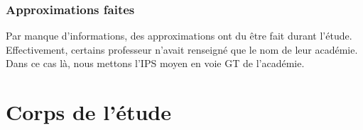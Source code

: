 \documentclass[a4paper, 11pt]{article}
\begin{document}
\subsubsection{Approximations faites}
Par manque d'informations, des approximations ont du être fait durant l'étude. Effectivement, certains professeur n'avait renseigné que le nom de leur académie. Dans ce cas là, nous mettons l'IPS moyen en voie GT de l'académie.

\newpage

\section{Corps de l'étude}
\end{document}
